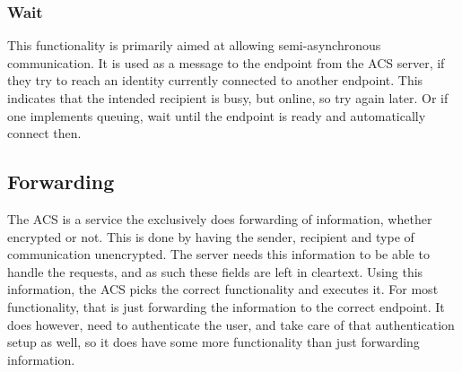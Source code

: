 	\subsubsection*{Wait}
	This functionality is primarily aimed at allowing semi-asynchronous communication. It is used as a message to the endpoint from the ACS server, if they try to reach an identity currently connected to another endpoint. This indicates that the intended recipient is busy, but online, so try again later. Or if one implements queuing, wait until the endpoint is ready and automatically connect then.

	



	


	\subsection{Forwarding}
	The ACS is a service the exclusively does forwarding of information, whether encrypted or not. This is done by having the sender, recipient and type of communication unencrypted. The server needs this information to be able to handle the requests, and as such these fields are left in cleartext. Using this information, the ACS picks the correct functionality and executes it. For most functionality, that is just forwarding the information to the correct endpoint. It does however, need to authenticate the user, and take care of that authentication setup as well, so it does have some more functionality than just forwarding information.
	
